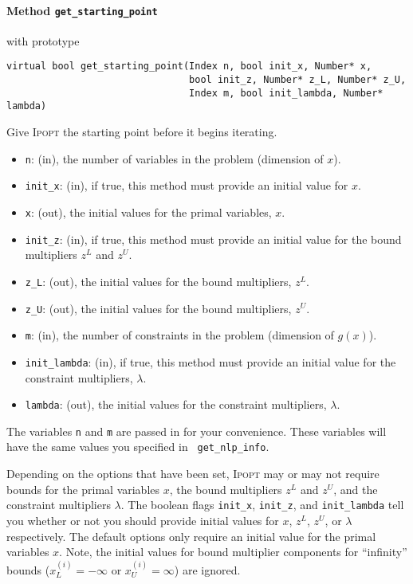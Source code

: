 \documentclass[10pt]{article}
\newcommand{\Ipopt}{\textsc{Ipopt}\xspace}
\begin{document}
\paragraph{Method {\texttt{get\_starting\_point}}} with prototype
\begin{verbatim}
virtual bool get_starting_point(Index n, bool init_x, Number* x,
                                bool init_z, Number* z_L, Number* z_U,
                                Index m, bool init_lambda, Number* lambda)
\end{verbatim}
Give \Ipopt the starting point before it begins iterating.
\begin{itemize}
\item {\tt n}: (in), the number of variables in the problem (dimension of $x$). 
\item {\tt init\_x}: (in), if true, this method must provide an initial value for $x$.
\item {\tt x}: (out), the initial values for the primal variables, $x$.
\item {\tt init\_z}: (in), if true, this method must provide an initial value 
        for the bound multipliers $z^L$ and $z^U$.
\item {\tt z\_L}: (out), the initial values for the bound multipliers, $z^L$.
\item {\tt z\_U}: (out), the initial values for the bound multipliers, $z^U$.
\item {\tt m}: (in), the number of constraints in the problem (dimension of $g(x)$).
\item {\tt init\_lambda}: (in), if true, this method must provide an initial value 
        for the constraint multipliers, $\lambda$.
\item {\tt lambda}: (out), the initial values for the constraint multipliers, $\lambda$.
\end{itemize}

The variables {\tt n} and {\tt m} are passed in for your convenience.
These variables will have the same values you specified in {\tt
  get\_nlp\_info}.

Depending on the options that have been set, \Ipopt may or may not
require bounds for the primal variables $x$, the bound multipliers
$z^L$ and $z^U$, and the constraint multipliers $\lambda$. The boolean
flags {\tt init\_x}, {\tt init\_z}, and {\tt init\_lambda} tell you
whether or not you should provide initial values for $x$, $z^L$, $z^U$, or
$\lambda$ respectively. The default options only require an initial
value for the primal variables $x$.  Note, the initial values for
bound multiplier components for ``infinity'' bounds
($x_L^{(i)}=-\infty$ or $x_U^{(i)}=\infty$) are ignored.
\end{document}
